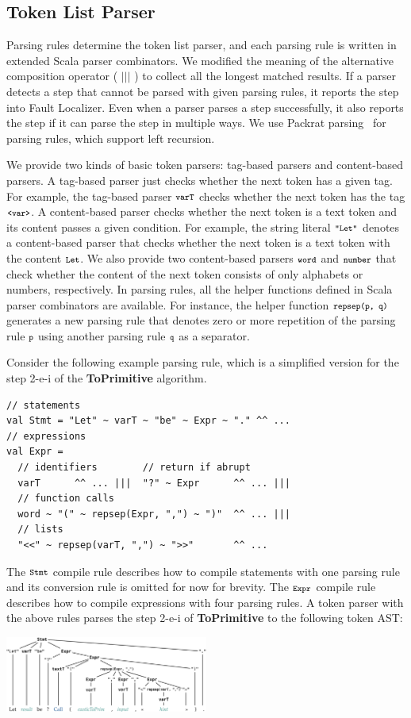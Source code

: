 \subsection{Token List Parser}
Parsing rules determine the token list parser, and each parsing rule
is written in extended Scala parser combinators.  We modified the
meaning of the alternative composition operator ( \( ||| \) ) to collect
all the longest matched results.  If a parser detects a step that
cannot be parsed with given parsing rules, it reports the step into
{\sf Fault Localizer}.  Even when a parser parses a step successfully,
it also reports the step if it can parse the step in multiple ways.
We use Packrat parsing~\cite{packrat} for parsing rules, which
support left recursion.

We provide two kinds of basic token parsers: tag-based parsers and
content-based parsers.  A tag-based parser just checks whether the next
token has a given tag.  For example, the tag-based parser \( \texttt{\footnotesize varT} \)
checks whether the next token has the tag \( \texttt{\footnotesize<var>} \).  A
content-based parser checks whether the next token is a text token and
its content passes a given condition.  For example, the string literal
\( \texttt{\footnotesize"Let"} \) denotes a content-based parser that checks whether
the next token is a text token with the content \( \texttt{\footnotesize Let} \).
We also provide two content-based parsers \( \texttt{\footnotesize word} \) and
\( \texttt{\footnotesize number} \) that check whether the content of the next token
consists of only alphabets or numbers, respectively.  In parsing
rules, all the helper functions defined in Scala parser combinators
are available.  For instance, the helper function \( \texttt{\footnotesize repsep(p, q)} \)
generates a new parsing rule that denotes zero or more repetition of the
parsing rule \( \texttt{\footnotesize p} \) using another parsing rule \( \texttt{\footnotesize q} \) as
a separator.

Consider the following example parsing rule, which is a simplified
version for the step 2-e-i of the \textbf{ToPrimitive} algorithm.
\begin{lstlisting}[style=myScalastyle]
// statements
val Stmt = "Let" ~ varT ~ "be" ~ Expr ~ "." ^^ ...
// expressions
val Expr =
  // identifiers        // return if abrupt
  varT      ^^ ... |||  "?" ~ Expr      ^^ ... |||
  // function calls
  word ~ "(" ~ repsep(Expr, ",") ~ ")"  ^^ ... |||
  // lists
  "<<" ~ repsep(varT, ",") ~ ">>"       ^^ ...
\end{lstlisting}
The \( \texttt{\footnotesize Stmt} \) compile rule describes how to compile statements
with one parsing rule and its conversion rule is omitted for now for
brevity.  The \( \texttt{\footnotesize Expr} \) compile rule describes how to compile
expressions with four parsing rules.  A token parser with the above
rules parses the step 2-e-i of \textbf{ToPrimitive} to the following
token AST:
\begin{center}
\includegraphics[width=0.5\textwidth]{img/token_ast.png}
\end{center}

